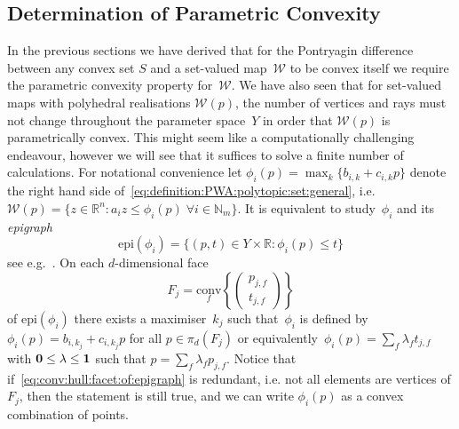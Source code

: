 \documentclass[a4paper, 12pt, twoside]{article}
\theoremstyle{definition}
\numberwithin{equation}{section}
\providecommand{\conv}{\text{conv}}
\providecommand{\epi}{\text{epi}}
\begin{document}
\subsection{Determination of Parametric Convexity}
In the previous sections we have derived that for the Pontryagin difference between any convex set $S$ and a set-valued map~$\mathcal W$ to be convex itself we require the parametric convexity property for~$\mathcal W$.
%
We have also seen that for set-valued maps with polyhedral realisations $\mathcal W(p)$, the number of vertices and rays must not change throughout the parameter space~$Y$ in order that $\mathcal W(p)$ is parametrically convex.
%
This might seem like a computationally challenging endeavour, however we will see that it suffices to solve a finite number of calculations.
%
For notational convenience let $\phi_i(p) = \max_k\{b_{i,k}+c_{i,k}p\}$ denote the right hand side of~\eqref{eq:definition:PWA:polytopic:set:general}, i.e. $\mathcal W(p) = \{z\in\mathbb R^n: a_i z\leq \phi_i(p)\;\forall i\in\mathbb N_m\}$.
%
It is equivalent to study~$\phi_i$ and its \emph{epigraph} 
%
$$
	\epi(\phi_i) = \{(p,t)\in Y\times\mathbb R: \phi_i(p)\leq t\}
$$
%
see e.g.~\cite{Gorokhovik:1993}.
%
On each $d$-dimensional face 
%
\begin{equation}\label{eq:conv:hull:facet:of:epigraph}
F_j = \underset{f}{\conv}\left\{\left(\begin{array}{c}p_{j,f}\\ t_{j,f}\end{array}\right)\right\}
\end{equation}
%
of $\epi(\phi_i)$ there exists a maximiser~$k_j$ such that~$\phi_i$ is defined by~$\phi_i(p)=b_{i,k_j}+c_{i,k_j}p$ for all $p\in\pi_d(F_j)$ or equivalently~$\phi_i(p)=\sum_{f}\lambda_f t_{j,f}$ with ${\bf{0}}\leq\lambda\leq{\bf{1}}$ such that $p=\sum_{f}\lambda_f p_{j,f}$.
%
Notice that if~\eqref{eq:conv:hull:facet:of:epigraph} is redundant, i.e. not all elements are vertices of $F_j$, then the statement is still true, and we can write $\phi_i(p)$ as a convex combination of points.
\end{document}
